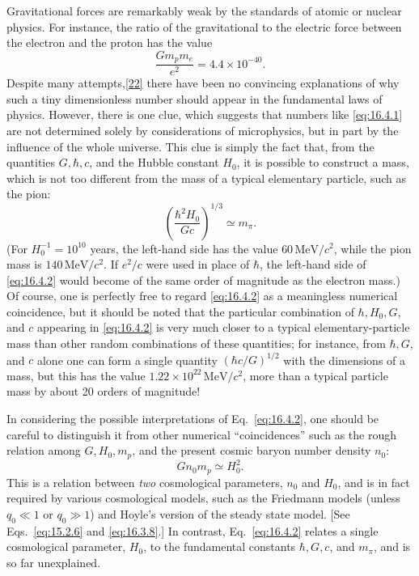 Gravitational forces are remarkably weak by the standards of atomic or nuclear
physics. For instance, the ratio of the gravitational to the electric force
between the electron and the proton has the value
\begin{equation}
  \frac{Gm_pm_e}{e^2}
  =
  4.4\times10^{-40}.
  \tag{16.4.1}\label{eq:16.4.1}
\end{equation}
Despite many attempts,\hyperref[ch16-ref-22]{[22]} there have been no
convincing explanations of why such a tiny dimensionless number should appear
in the fundamental laws of physics. However, there is one clue, which suggests
that numbers like \eqref{eq:16.4.1} are not determined solely by considerations
of microphysics, but in part by the influence of the whole universe. This clue
is simply the fact that, from the quantities \(G,\hbar,c\), and the Hubble
constant \(H_0\), it is possible to construct a mass, which is not too different
from the mass of a typical elementary particle, such as the pion:
\begin{equation}
  \left(\frac{\hbar^2H_0}{Gc}\right)^{1/3}
  \simeq m_\pi.
  \tag{16.4.2}\label{eq:16.4.2}
\end{equation}
(For \(H_0^{-1}=10^{10}\) years, the left-hand side has the value
\(60\,\mathrm{MeV}/c^2\), while the pion mass is
\(140\,\mathrm{MeV}/c^2\). If \(e^2/c\) were used in place of \(\hbar\),
the left-hand side of \eqref{eq:16.4.2} would become of the same order of
magnitude as the electron mass.) Of course, one is perfectly free to regard
\eqref{eq:16.4.2} as a meaningless numerical coincidence, but it should be
noted that the particular combination of \(\hbar,H_0,G\), and \(c\) appearing
in \eqref{eq:16.4.2} is very much closer to a typical elementary-particle mass
than other random combinations of these quantities; for instance, from
\(\hbar,G\), and \(c\) alone one can form a single quantity
\((\hbar c/G)^{1/2}\) with the dimensions of a mass, but this has the value
\(1.22\times10^{22}\,\mathrm{MeV}/c^2\), more than a typical particle mass by
about 20 orders of magnitude!

In considering the possible interpretations of Eq.~\eqref{eq:16.4.2}, one
should be careful to distinguish it from other numerical ``coincidences'' such
as the rough relation among \(G,H_0,m_p\), and the present cosmic baryon number
density \(n_0\):
\begin{equation}
  Gn_0m_p\simeq H_0^2.
  \tag{16.4.3}\label{eq:16.4.3}
\end{equation}
This is a relation between \emph{two} cosmological parameters, \(n_0\) and
\(H_0\), and is in fact required by various cosmological models, such as the
Friedmann models (unless \(q_0\ll1\) or \(q_0\gg1\)) and Hoyle's version of the
steady state model. [See Eqs.~\eqref{eq:15.2.6} and \eqref{eq:16.3.8}.]
In contrast, Eq.~\eqref{eq:16.4.2} relates a single cosmological parameter,
\(H_0\), to the fundamental constants \(\hbar,G,c\), and \(m_\pi\), and is so
far unexplained.

